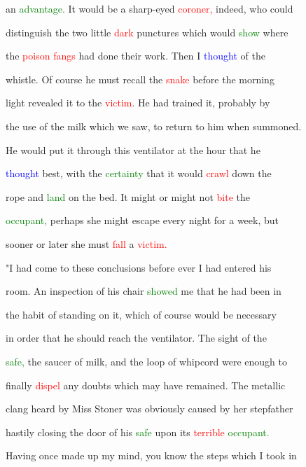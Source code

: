 an \textcolor{green}{advantage.} It would be a sharp-eyed \textcolor{red}{coroner,} indeed, who could

 distinguish the two little \textcolor{red}{dark} punctures which would \textcolor{green}{show} where

 the \textcolor{red}{poison} \textcolor{red}{fangs} had done their work. Then I \textcolor{blue}{thought} of the

 whistle. Of course he must recall the \textcolor{red}{snake} before the morning

 light revealed it to the \textcolor{red}{victim.} He had trained it, probably by

 the use of the milk which we saw, to return to him when summoned.

 He would put it through this ventilator at the hour that he

 \textcolor{blue}{thought} best, with the \textcolor{green}{certainty} that it would \textcolor{red}{crawl} down the

 rope and \textcolor{green}{land} on the bed. It might or might not \textcolor{red}{bite} the

 \textcolor{green}{occupant,} perhaps she might \textcolor{BurntOrange}{escape} every night for a week, but

 sooner or later she must \textcolor{red}{fall} a \textcolor{red}{victim.}



 "I had come to these conclusions before ever I had entered his

 room. An inspection of his chair \textcolor{green}{showed} me that he had been in

 the habit of standing on it, which of course would be necessary

 in order that he should reach the ventilator. The sight of the

 \textcolor{green}{safe,} the saucer of milk, and the loop of whipcord were enough to

 \textcolor{BurntOrange}{finally} \textcolor{red}{dispel} any \textcolor{BurntOrange}{doubts} which may have remained. The metallic

 clang heard by Miss Stoner was obviously caused by her stepfather

 hastily closing the door of his \textcolor{green}{safe} upon its \textcolor{red}{terrible} \textcolor{green}{occupant.}

 Having once made up my mind, you know the steps which I took in

